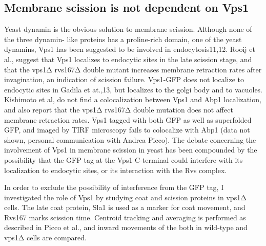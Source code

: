 	\subsection{Membrane scission is not dependent on Vps1}
	Yeast dynamin is the obvious solution to membrane scission. Although none of the three dynamin- like proteins has a proline-rich domain, one of the yeast dynamins, Vps1 has been suggested to be involved in endocytosis11,12. Rooij et al., suggest that Vps1 localizes to endocytic sites in the late scission stage, and that the vps1Δ rvs167Δ double mutant increases membrane retraction rates after invagination, an indication of scission failure. Vps1-GFP does not localize to endocytic sites in Gadila et at.,13, but localizes to the golgi body and to vacuoles. Kishimoto et al, do not find a colocalization between Vps1 and Abp1 localization, and also report that the vps1Δ rvs167Δ  double mutation does not affect membrane retraction rates. Vps1 tagged with both GFP as well as superfolded GFP, and imaged by TIRF microscopy fails to colocalize with Abp1 (data not shown, personal communication with Andrea Picco). The debate concerning the involvement of Vps1 in membrane scission in yeast has been compounded by the possibility that the GFP tag at the Vps1 C-terminal could interfere with its localization to endocytic sites, or its interaction with the Rvs complex. 
	
	\vspace{5mm}
	In order to exclude the possibility of interference from the GFP tag, I investigated the role of Vps1 by studying coat and scission proteins in vps1Δ cells. The late coat protein, Sla1 is used as a marker for coat movement, and Rvs167 marks scission time. Centroid tracking and averaging is performed as described in Picco et al., and inward movements of the both in wild-type and vps1Δ cells are compared. 

